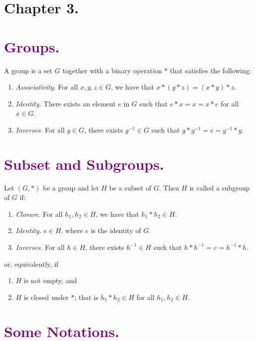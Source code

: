 \documentclass{article}
\begin{document}
   \section*{Chapter 3.}

   \section*{\textcolor{purple}{Groups.}} A group is a set $G$ together with a
   binary operation $*$ that satisfies the following:
   \begin{enumerate}
      \item \textit{Associativity.} For all $x, y, z \in G$, we have that
            $x * (y * z) = (x * y) * z$.
      \item \textit{Identity.} There exists an element $e$ in $G$ such that
            $e * x = x = x * e$ for all $x \in G$.
      \item \textit{Inverses.} For all $g \in G$, there exists $g^{-1} \in G$
            such that $g * g^{-1} = e = g^{-1} * g$.
   \end{enumerate}

   \section*{\textcolor{purple}{Subset and Subgroups.}} Let $(G, *)$ be a
   group and let $H$ be a subset of $G$. Then $H$ is called a subgroup of $G$
   if:
   \begin{enumerate}
      \item \textit{Closure.} For all $h_1, h_2 \in H$, we have that
            $h_1 * h_2 \in H$.
      \item \textit{Identity.} $e \in H$, where $e$ is the identity of $G$.
      \item \textit{Inverses.} For all $h \in H$, there exists $h^{-1} \in H$
            such that $h * h^{-1} = e = h^{-1} * h$.
   \end{enumerate}

   or, equivalently, if
   \begin{enumerate}
      \item $H$ is not empty, and
      \item $H$ is closed under $*$; that is $h_1 * h_2 \in H$ for 
            all $h_1, h_2 \in H$.
   \end{enumerate}

   \section*{\textcolor{purple}{Some Notations.}}
\end{document}
